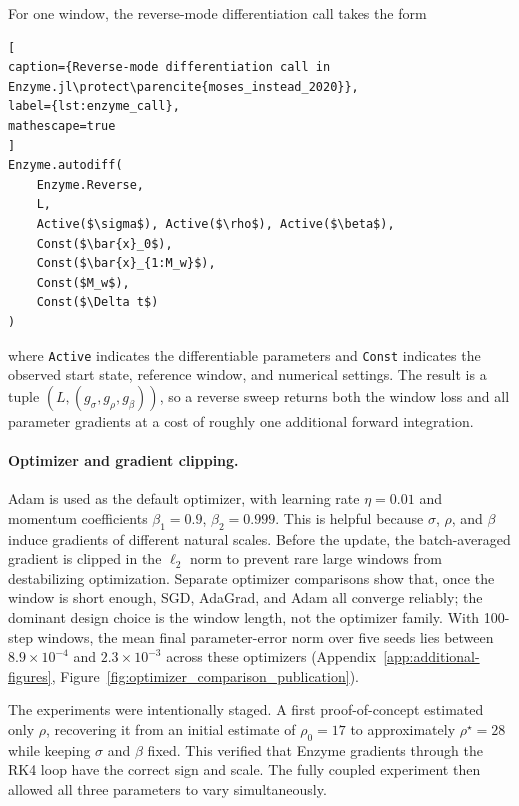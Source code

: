 For one window, the reverse-mode differentiation call takes the form

\begin{lstlisting}[
caption={Reverse-mode differentiation call in Enzyme.jl\protect\parencite{moses_instead_2020}},
label={lst:enzyme_call},
mathescape=true
]
Enzyme.autodiff(
    Enzyme.Reverse,
    L,
    Active($\sigma$), Active($\rho$), Active($\beta$),
    Const($\bar{x}_0$),
    Const($\bar{x}_{1:M_w}$),
    Const($M_w$),
    Const($\Delta t$)
)
\end{lstlisting}

where \texttt{Active} indicates the differentiable parameters and \texttt{Const} indicates the observed start state, reference window, and numerical settings. The result is a tuple $(L,(g_\sigma,g_\rho,g_\beta))$, so a reverse sweep returns both the window loss and all parameter gradients at a cost of roughly one additional forward integration.

\paragraph{Optimizer and gradient clipping.}

Adam \parencite{blondel_elements_2024} is used as the default optimizer, with learning rate $\eta=0.01$ and momentum coefficients $\beta_1=0.9$, $\beta_2=0.999$. This is helpful because $\sigma$, $\rho$, and $\beta$ induce gradients of different natural scales. Before the update, the batch-averaged gradient is clipped in the $\ell_2$ norm to prevent rare large windows from destabilizing optimization. Separate optimizer comparisons show that, once the window is short enough, SGD, AdaGrad, and Adam all converge reliably; the dominant design choice is the window length, not the optimizer family. With 100-step windows, the mean final parameter-error norm over five seeds lies between $8.9\times10^{-4}$ and $2.3\times10^{-3}$ across these optimizers (Appendix~\ref{app:additional-figures}, Figure~\ref{fig:optimizer_comparison_publication}).

The experiments were intentionally staged. A first proof-of-concept estimated only $\rho$, recovering it from an initial estimate of $\rho_0=17$ to approximately $\rho^\star=28$ while keeping $\sigma$ and $\beta$ fixed. This verified that Enzyme gradients through the RK4 loop have the correct sign and scale. The fully coupled experiment then allowed all three parameters to vary simultaneously.

